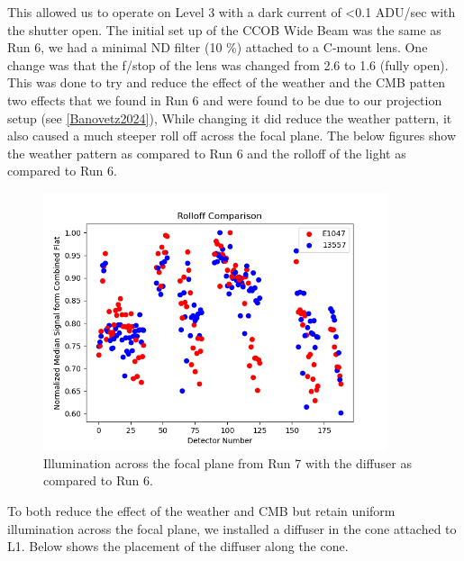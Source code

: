 This allowed us to operate on Level 3 with a dark current of
\textless0.1 ADU/sec with the shutter open. The initial set up of the
CCOB Wide Beam was the same as Run 6, we had a minimal ND filter (10 \%)
attached to a C-mount lens. One change was that the f/stop of the lens
was changed from 2.6 to 1.6 (fully open). This was done to try and
reduce the effect of the \textquotesingle weather\textquotesingle{} and
the \textquotesingle CMB patten\textquotesingle{} two effects that we
found in Run 6 and were found to be due to our projection setup (see
\hyperref[Banovetz2024]{{[}Banovetz2024{]}}), While changing it did
reduce the weather pattern, it also caused a much steeper roll off
across the focal plane. The below figures show the weather pattern as
compared to Run 6 and the rolloff of the light as compared to Run 6.

\begin{figure}[htbp]
\centering
\includegraphics[width=0.9\textwidth]{sections/figures/Run7_DiffuserIllumination.png}
\caption{Illumination across the focal plane from Run 7 with the diffuser as compared to Run 6.}
\end{figure}

To both reduce the effect of the
\textquotesingle weather\textquotesingle{} and
\textquotesingle CMB\textquotesingle{} but retain uniform illumination
across the focal plane, we installed a diffuser in the cone attached to
L1. Below shows the placement of the diffuser along the cone.

